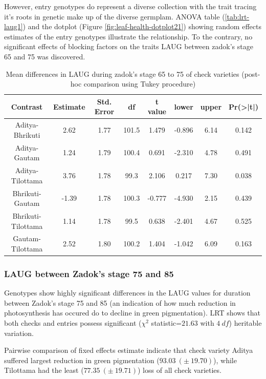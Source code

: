 \documentclass[12pt,oneside]{dukestatscithesis} %
\begin{document}
However, entry genotypes do represent a diverse collection with the trait tracing it's roots in genetic make up of the diverse germplam. ANOVA table (\ref{tab:lrt-laug1}) and the dotplot (Figure \ref{fig:leaf-health-dotplot21}) showing random effects estimates of the entry genotypes illustrate the relationship. To the contrary, no significant effects of blocking factors on the traits LAUG between zadok's stage 65 and 75 was discovered.
\begin{table}[H]

\caption{\label{tab:leaf-health-meanconf-tab5}Mean differences in LAUG during zadok's stage 65 to 75 of check varieties (post-hoc comparison using Tukey procedure)}
\centering
\begin{tabular}[t]{cccccccc}
\toprule
Contrast & Estimate & Std. Error & df & t value & lower & upper & Pr(>|t|)\\
\midrule
Aditya-Bhrikuti & 2.62 & 1.77 & 101.5 & 1.479 & -0.896 & 6.14 & 0.142\\
Aditya-Gautam & 1.24 & 1.79 & 100.4 & 0.691 & -2.310 & 4.78 & 0.491\\
Aditya-Tilottama & 3.76 & 1.78 & 99.3 & 2.106 & 0.217 & 7.30 & 0.038\\
Bhrikuti-Gautam & -1.39 & 1.78 & 100.3 & -0.777 & -4.930 & 2.15 & 0.439\\
Bhrikuti-Tilottama & 1.14 & 1.78 & 99.5 & 0.638 & -2.401 & 4.67 & 0.525\\
Gautam-Tilottama & 2.52 & 1.80 & 100.2 & 1.404 & -1.042 & 6.09 & 0.163\\
\bottomrule
\end{tabular}
\end{table}
\hypertarget{laug-between-zadoks-stage-75-and-85}{%
\subsubsection{LAUG between Zadok's stage 75 and 85}\label{laug-between-zadoks-stage-75-and-85}}

Genotypes show highly significant differences in the LAUG values for duration between Zadok's stage 75 and 85 (an indication of how much reduction in photosynthesis has occured do to decline in green pigmentation). LRT shows that both checks and entries possess significant (\(\chi^2\) statistic=\(21.63\) with \(4\ df\)) heritable variation.

Pairwise comparison of fixed effects estimate indicate that check variety Aditya suffered largest reduction in green pigmentation (\(93.03\ (\pm\ 19.70)\)), while Tilottama had the least (\(77.35\ (\pm\ 19.71)\)) loss of all check varieties.
\end{document}
